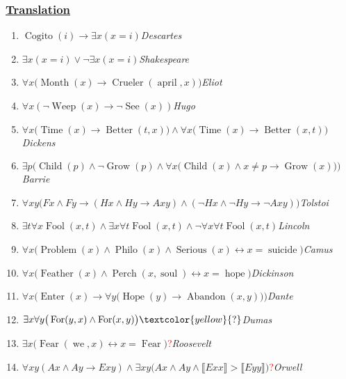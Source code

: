 \documentclass[UTF8,11pt,colorlinks,compress,openany]{beamer}%
\begin{document}
\begin{frame}\frametitle{\href{http://jdh.hamkins.org/famous-quotations-in-their-original-language/}{Translation}}
\begin{enumerate}
\item $\operatorname{Cogito}(i)\to\exists x(x=i)$\hfill \textsl{Descartes}
\item $\exists x(x=i)\vee\neg\exists x(x=i)$\hfill \textsl{Shakespeare}
\item $\forall x\big(\operatorname{Month}(x)\to\operatorname{Crueler}(\operatorname{april},x)\big)$\hfill \textsl{Eliot}
\item $\forall x(\neg\operatorname{Weep}(x)\to\neg\operatorname{See}(x))$\hfill \textsl{Hugo}
\item $\forall x\big(\operatorname{Time}(x)\to\operatorname{Better}(t,x)\big)\wedge\forall x\big(\operatorname{Time}(x)\to\operatorname{Better}(x,t)\big)$\hfill \textsl{Dickens}
\item $\exists p\Big(\operatorname{Child}(p)\wedge\neg\operatorname{Grow}(p)\wedge\forall x\big(\operatorname{Child}(x)\wedge x\ne p\to\operatorname{Grow}(x)\big)\Big)$\hfill \textsl{Barrie}
\item $\forall xy\big(Fx\wedge Fy\to (Hx\wedge Hy\to Axy)\wedge(\neg Hx\wedge\neg Hy\to\neg Axy)\big)$\hfill \textsl{Tolstoi}
\item $\exists t\forall x \operatorname{Fool}(x,t)\wedge \exists x\forall t \operatorname{Fool}(x,t)\wedge\neg\forall x\forall t \operatorname{Fool}(x,t)$\hfill \textsl{Lincoln}
\item $\forall x\big(\operatorname{Problem}(x)\wedge\operatorname{Philo}(x)\wedge\operatorname{Serious}(x)\leftrightarrow x=\operatorname{suicide}\big)$\hfill \textsl{Camus}
\item $\forall x\big(\operatorname{Feather}(x)\wedge\operatorname{Perch}(x,\operatorname{soul})\leftrightarrow x=\operatorname{hope}\big)$\hfill \textsl{Dickinson}
\item $\forall x\Big(\operatorname{Enter}(x)\to\forall y\big(\operatorname{Hope}(y)\to\operatorname{Abandon}(x,y)\big)\Big)$\hfill \textsl{Dante}
\item $\exists x\forall y\big(\operatorname{For}(y,x)\wedge\operatorname{For}(x,y)\big)\textcolor{yellow}{?}$\hfill \textsl{Dumas}
\item $\exists x\big(\operatorname{Fear}(\operatorname{we},x)\leftrightarrow x=\operatorname{Fear}\big)$\textcolor{red}{?}\hfill \textsl{Roosevelt}
\item $\forall xy(Ax\wedge Ay\to Exy)\wedge\exists xy\big(Ax\wedge Ay\wedge\llbracket Exx\rrbracket>\llbracket Eyy\rrbracket\big)$\textcolor{red}{?}\hfill \textsl{Orwell}
\end{enumerate}
\end{frame}
\end{document}
